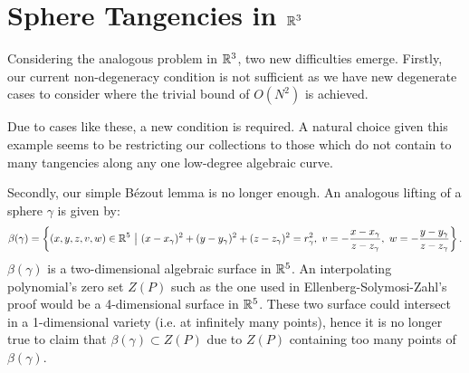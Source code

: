 \section{Sphere Tangencies in $\mathbb R^{3}$}
Considering the analogous problem in $\mathbb R^{3}$, two new difficulties emerge. 
Firstly, our current non-degeneracy condition is not sufficient as we have new degenerate cases to consider where the trivial bound of $O(N^2)$ is achieved. 
\begin{example}
\end{example}
Due to cases like these, a new condition is required. A natural choice given this example seems to be restricting our collections to those which do not contain to many tangencies along any one low-degree algebraic curve. 

Secondly, our simple Bézout lemma is no longer enough. An analogous lifting of a sphere $\gamma$ is given by:
\[
\beta(\gamma) = \left \{ (x,y,z,v,w) \in \mathbb R^5 \ \big | \ (x-x_\gamma)^2 + (y-y_\gamma)^2 + (z-z_\gamma)^2 = r_\gamma^2, \ v = - \frac{x-x_\gamma}{z-z_\gamma}, \ w = - \frac{y-y_\gamma}{z-z_\gamma} \right \}.
\]
$\beta(\gamma)$ is a two-dimensional algebraic surface in $\mathbb R^5$. An interpolating polynomial's zero set $Z(P)$ such as the one used in Ellenberg-Solymosi-Zahl's proof would be a 4-dimensional surface in $\mathbb R^5$.
These two surface could intersect in a 1-dimensional variety (i.e. at infinitely many points), hence it is no longer true to claim that $\beta(\gamma) \subset Z(P)$ due to $Z(P)$ containing too many points of $\beta(\gamma)$.

